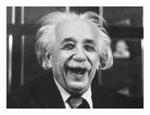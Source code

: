 \documentclass[a4paper]{article}
\begin{document}
\begin{figure}[H]
 \centering
 \includegraphics[width=0.4\textwidth]{einstein.jpeg}
 \label{Einstein}
\end{figure}
\end{document}
